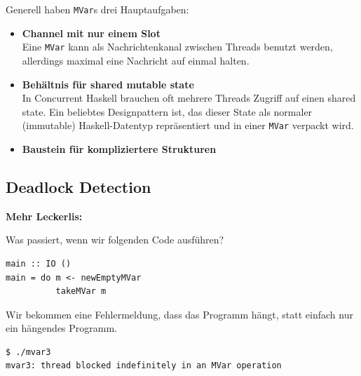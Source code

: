 \documentclass{beamer}
\begin{document}

\begin{frame}
Generell haben \texttt{MVar}s drei Hauptaufgaben:\pause

\begin{itemize}
\item \textbf{Channel mit nur einem Slot}\\
Eine \texttt{MVar} kann als Nachrichtenkanal zwischen Threads benutzt werden, allerdings maximal eine Nachricht auf einmal halten.\pause

\item \textbf{Behältnis für shared mutable state}\\
In Concurrent Haskell brauchen oft mehrere Threads Zugriff auf einen shared state. Ein beliebtes Designpattern ist, das dieser State als normaler (immutable) Haskell-Datentyp repräsentiert und in einer \texttt{MVar} verpackt wird.\pause

\item \textbf{Baustein für kompliziertere Strukturen}
\end{itemize}
\end{frame}


\subsection{Deadlock Detection}

\begin{frame}[fragile]

\textbf{Mehr Leckerlis:}\smallskip\smallskip

Was passiert, wenn wir folgenden Code ausführen?

\begin{verbatim}
main :: IO ()
main = do m <- newEmptyMVar
          takeMVar m
\end{verbatim}
\pause
\bigskip

Wir bekommen eine Fehlermeldung, dass das Programm hängt, statt einfach nur ein hängendes Programm.

\begin{verbatim}
$ ./mvar3
mvar3: thread blocked indefinitely in an MVar operation
\end{verbatim}
\end{frame}

\end{document}
